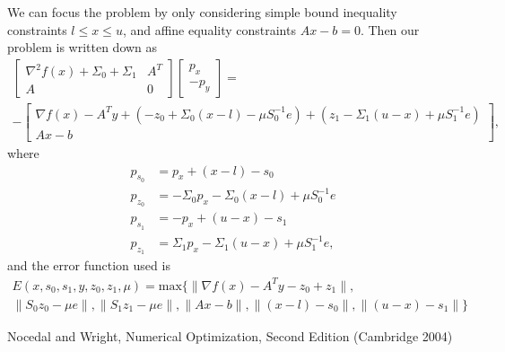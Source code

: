 \documentclass{article}
\begin{document}
We can focus the problem by only considering 
    simple bound inequality constraints $l \le x \le u$, and
    affine equality constraints $A x - b = 0$.
Then our problem is written down as
\begin{multline}
\begin{bmatrix}
    \nabla^2 f(x) + \Sigma_0 + \Sigma_1 & A^T \\
    A & 0 
\end{bmatrix}
\begin{bmatrix} p_x \\ -p_y \end{bmatrix}
    = \\ -
\begin{bmatrix}
    \nabla f(x) - A^T y + (-z_0 + \Sigma_0 (x - l) - \mu S_0^{-1} e) 
                        + (z_1 - \Sigma_1 (u - x) + \mu S_1^{-1} e) \\
    A x - b
\end{bmatrix},
\end{multline}
where
\begin{align}
    p_{s_0} &= p_x + (x - l) - s_0 \\
    p_{z_0} &= -\Sigma_0 p_x - \Sigma_0 (x - l) + \mu S_0^{-1} e \\
    p_{s_1} &= -p_x + (u - x) - s_1 \\
    p_{z_1} &= \Sigma_1 p_x - \Sigma_1 (u - x) + \mu S_1^{-1} e,
\end{align}
and the error function used is
\begin{multline}
E(x, s_0, s_1, y, z_0, z_1, \mu) = \text{max}\{ 
    \| \nabla f(x) - A^T y - z_0 + z_1 \|, \\
    \| S_0 z_0 - \mu e \|, 
    \| S_1 z_1 - \mu e \|, 
    \| A x - b \|, 
    \|(x - l) - s_0 \|, 
    \|(u - x) - s_1 \| \}
\end{multline}





\begin{thebibliography}{99}
 Nocedal and Wright, 
    Numerical Optimization, Second Edition (Cambridge 2004)
\end{thebibliography}
\end{document}
